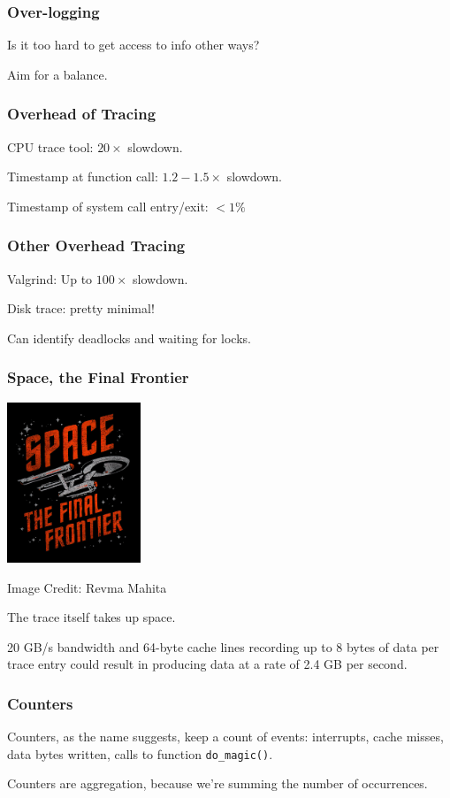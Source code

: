 \begin{frame}
\frametitle{Over-logging}

Is it too hard to get access to info other ways?

Aim for a balance.


\end{frame}


\begin{frame}
\frametitle{Overhead of Tracing}

CPU trace tool: $20\times$ slowdown.

Timestamp at function call: $1.2-1.5\times$ slowdown.

Timestamp of system call entry/exit: $< 1\%$

\end{frame}


\begin{frame}
\frametitle{Other Overhead Tracing}

Valgrind: Up to $100\times$ slowdown.

Disk trace: pretty minimal!

Can identify deadlocks and waiting for locks.

\end{frame}


\begin{frame}
\frametitle{Space, the Final Frontier}

\begin{center}
	\includegraphics[width=0.3\textwidth]{images/finalfrontier.jpg}
\end{center}
\hfill Image Credit: Revma Mahita

The trace itself takes up space.

20 GB/s bandwidth and 64-byte cache lines recording up to 8 bytes of data per trace entry could result in producing data at a rate of 2.4 GB per second.

\end{frame}


\begin{frame}
\frametitle{Counters}

Counters, as the name suggests, keep a count of events: interrupts, cache misses, data bytes written, calls to function \texttt{do\_magic()}.


Counters are aggregation, because we're summing the number of occurrences.

\end{frame}


